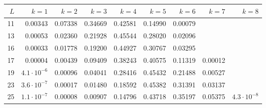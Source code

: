 \begin{tabular}{rrrrrrrrr}
\toprule
$L$ & $k=1$ & $k=2$ & $k=3$ & $k=4$ & $k=5$ & $k=6$ & $k=7$ & $k=8$\\
\midrule
11 & 0.00343 & 0.07338 & 0.34669 & 0.42581 & 0.14990 & 0.00079 &  & \\
13 & 0.00053 & 0.02360 & 0.21928 & 0.45544 & 0.28020 & 0.02096 &  & \\
16 & 0.00033 & 0.01778 & 0.19200 & 0.44927 & 0.30767 & 0.03295 &  & \\
17 & 0.00004 & 0.00439 & 0.09409 & 0.38243 & 0.40575 & 0.11319 & 0.00012 & \\
19 & $4.1\cdot10^{-6}$ & 0.00096 & 0.04041 & 0.28416 & 0.45432 & 0.21488 & 0.00527 & \\
23 & $3.6\cdot10^{-7}$ & 0.00017 & 0.01480 & 0.18592 & 0.45382 & 0.31391 & 0.03137 & \\
25 & $1.1\cdot10^{-7}$ & 0.00008 & 0.00907 & 0.14796 & 0.43718 & 0.35197 & 0.05375 & $4.3\cdot10^{-8}$\\
\bottomrule
\end{tabular}